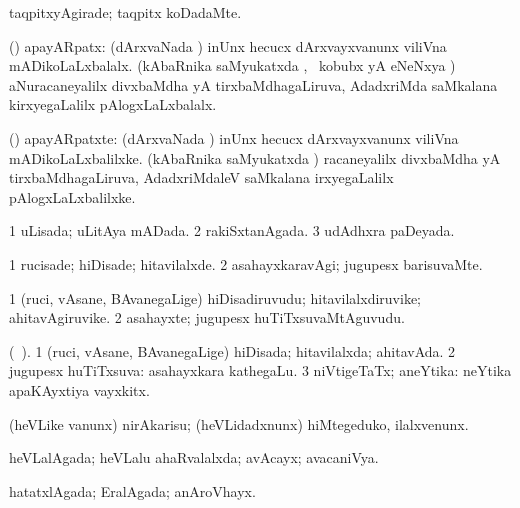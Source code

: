 \bentry
{} 
\gl{\kirxvi}
\expl{}
\bmng
taqpitxyAgirade; taqpitx koDadaMte. 
\emng
\eentry

\bentry
{} 
\gl{\gu}
\expl{}
\bmng
(\ravi) apayARpatx: 
\banum
{} (dArxvaNada \vi) inUnx hecucx dArxvayxvanunx viliVna mADikoLaLxbalalx. 
 (kAbaRnika saMyukatxda \vi, \kanmu\ kobubx yA eNeNxya \vi) aNuracaneyalilx divxbaMdha yA tirxbaMdhagaLiruva, AdadxriMda saMkalana kirxyegaLalilx pAlogxLaLxbalalx. 
\eanum
\emng
\eentry

\bentry
{} 
\gl{\nA}
\expl{}
\bmng
(\ravi) apayARpatxte: 
\banum
{} (dArxvaNada \vi) inUnx hecucx dArxvayxvanunx viliVna mADikoLaLxbalilxke. 
 (kAbaRnika saMyukatxda \vi) racaneyalilx divxbaMdha yA tirxbaMdhagaLiruva, AdadxriMdaleV saMkalana irxyegaLalilx pAlogxLaLxbalilxke. 
\eanum
\emng
\eentry

\bentry
{} 
\gl{\gu}
\expl{}
\bmng
\bnum
\num{1} uLisada; uLitAya mADada. 
\num{2} rakiSxtanAgada. 
\num{3} udAdhxra paDeyada. 
\enum
\emng
\eentry

\bentry
{} 
\gl{\kirxvi}
\expl{}
\bmng
\bnum
\num{1} rucisade; hiDisade; hitavilalxde. 
\num{2} asahayxkaravAgi; jugupesx barisuvaMte. 
\enum
\emng
\eentry

\bentry
{} 
\gl{\nA}
\expl{}
\bmng
\bnum
\num{1} (ruci, vAsane, BAvanegaLige) hiDisadiruvudu; hitavilalxdiruvike; ahitavAgiruvike. 
\num{2} asahayxte; jugupesx huTiTxsuvaMtAguvudu. 
\enum
\emng
\eentry

\bentry
{} 
\gl{\gu}
\expl{}
\bmng
(\ame\ ). 
\bnum
\num{1} (ruci, vAsane, BAvanegaLige) hiDisada; hitavilalxda; ahitavAda. 
\num{2} jugupesx huTiTxsuva:  asahayxkara kathegaLu. 
\num{3} niVtigeTaTx; aneYtika:  neYtika apaKAyxtiya vayxkitx. 
\enum
\emng
\eentry

\bentry
{} 
\gl{\akirx}
\bmng
(heVLike \mo vanunx) nirAkarisu; (heVLidadxnunx) hiMtegeduko, ilalxvenunx. 
\emng
\eentry

\bentry
{} 
\gl{\gu}
\expl{}
\bmng
heVLalAgada; heVLalu ahaRvalalxda; avAcayx; avacaniVya. 
\emng
\eentry

\bentry
{} 
\gl{\gu}
\expl{}
\bmng
hatatxlAgada; EralAgada; anAroVhayx. 
\emng
\eentry


